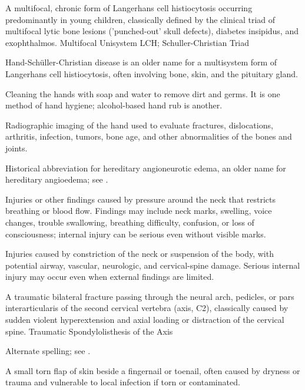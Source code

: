  A multifocal, chronic form of Langerhans cell histiocytosis occurring predominantly in young children, classically defined by the clinical triad of multifocal lytic bone lesions ('punched-out' skull defects), diabetes insipidus, and exophthalmos.
\synonyms
Multifocal Unisystem LCH; Schuller-Christian Triad

 Hand-Schüller-Christian disease is an older name for a multisystem form of Langerhans cell histiocytosis, often involving bone, skin, and the pituitary gland.

 Cleaning the hands with soap and water to remove dirt and germs. It is one method of hand hygiene; alcohol-based hand rub is another.

 Radiographic imaging of the hand used to evaluate fractures, dislocations, arthritis, infection, tumors, bone age, and other abnormalities of the bones and joints.

 Historical abbreviation for hereditary angioneurotic edema, an older name for hereditary angioedema; see .

 Injuries or other findings caused by pressure around the neck that restricts breathing or blood flow. Findings may include neck marks, swelling, voice changes, trouble swallowing, breathing difficulty, confusion, or loss of consciousness; internal injury can be serious even without visible marks.

 Injuries caused by constriction of the neck or suspension of the body, with potential airway, vascular, neurologic, and cervical-spine damage. Serious internal injury may occur even when external findings are limited.

 A traumatic bilateral fracture passing through the neural arch, pedicles, or pars interarticularis of the second cervical vertebra (axis, C2), classically caused by sudden violent hyperextension and axial loading or distraction of the cervical spine.
\synonyms
Traumatic Spondylolisthesis of the Axis

 Alternate spelling; see .

 A small torn flap of skin beside a fingernail or toenail, often caused by dryness or trauma and vulnerable to local infection if torn or contaminated.

